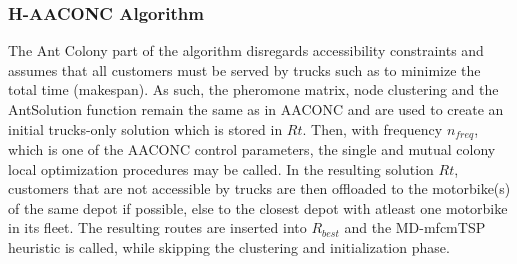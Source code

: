 \documentclass{article}
\begin{document}
	\subsubsection{H-AACONC Algorithm}
	The Ant Colony part of the algorithm disregards accessibility constraints and assumes that all customers must be served by trucks such as to minimize the total time (makespan). As such, the pheromone matrix, node clustering and the AntSolution function remain the same as in AACONC and are used to create an initial trucks-only solution which is stored in $Rt$. Then, with  frequency $n_{freq}$, which is one of the AACONC control parameters, the single and mutual colony local optimization procedures may be called. In the resulting solution $Rt$, customers that are not accessible by trucks are then offloaded to the motorbike(s) of the same depot if possible, else to the closest depot with atleast one motorbike in its fleet. The resulting routes are inserted into $R_{best}$ and the MD-mfcmTSP heuristic is called, while skipping the clustering and initialization phase.
\end{document}
